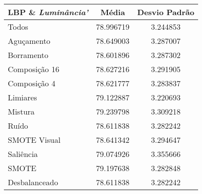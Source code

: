 \begin{table}[!htbp]
\centering
\caption{}
\label{tab:resultados:x:melhor}
\begin{tabular}{|l|c|c|}
\hline
\textbf{LBP  \& \emph{Luminância'}} & \textbf{Média}     & \textbf{Desvio Padrão} \\ \hline
   Todos        &  78.996719 &  3.244853  \\ \hline
  Aguçamento    &  78.649003 &  3.287007  \\ \hline
  Borramento    &  78.601896 &  3.287302  \\ \hline
  Composição 16 &  78.627216 &  3.291905  \\ \hline
  Composição 4  &  78.621777 &  3.283837  \\ \hline
  Limiares      &  79.122887 &  3.220693  \\ \hline
  Mistura       &  79.239798 &  3.309218  \\ \hline
  Ruído         &  78.611838 &  3.282242  \\ \hline
  SMOTE Visual  &  78.641342 &  3.294647  \\ \hline
  Saliência     &  79.074926 &  3.355666  \\ \hline
 SMOTE          &  79.197638 &  3.282848  \\ \hline
Desbalanceado   &  78.611838 &  3.282242  \\ \hline
\end{tabular}
\end{table}




